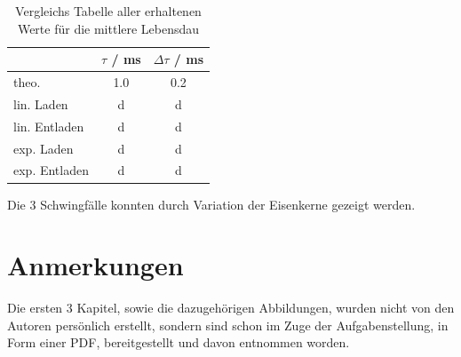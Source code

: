 \documentclass[11pt,ngerman]{scrartcl}
\begin{document}
\begin{table}[H]
	\caption{Vergleichs Tabelle aller erhaltenen Werte für die mittlere Lebensdau }
	\label{tab:ergebniszerfallskonstante}
	\begin{center}
		\begin{tabular}[c]{l|c|c}
			\hline
			\multicolumn{1}{c|}{\textbf{}}         &
			\multicolumn{1}{c|}{$\tau$ / \si{\ms}} &
			\multicolumn{1}{c}{$\Delta \tau$ / \si{\ms}}       \\
			\hline
			theo.                                  & 1.0 & 0.2 \\
			lin. Laden                             & d   & d   \\
			lin. Entladen                          & d   & d   \\
			exp. Laden                             & d   & d   \\
			exp. Entladen                          & d   & d   \\
			\hline
		\end{tabular}
	\end{center}
\end{table}


Die 3 Schwingfälle konnten durch Variation der Eisenkerne gezeigt werden.

\section{Anmerkungen}

Die ersten 3 Kapitel, sowie die dazugehörigen Abbildungen, wurden nicht von den
Autoren persönlich erstellt, sondern sind schon im Zuge der Aufgabenstellung,
in Form einer PDF, bereitgestellt und davon entnommen worden. \cite{pdf}


\newpage

%
%
\listoffigures
\listoftables
\end{document}
